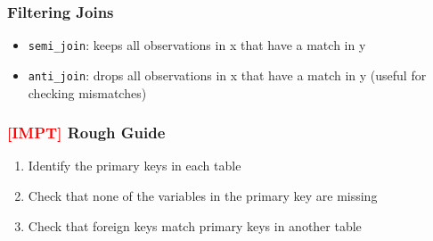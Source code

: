 \documentclass{article}
\newcommand{\impt}[0]{\textcolor{red}{\textbf{[IMPT] }}}
\begin{document}
\begin{multicols}{2}
\subsubsection{Filtering Joins}
\begin{itemize}
	\item \texttt{semi\_join}: keeps all observations in x that have a match in y
	\item \texttt{anti\_join}: drops all observations in x that have a match in y (useful for checking mismatches)
\end{itemize}
\subsubsection{\impt Rough Guide}
\begin{enumerate}
	\item Identify the primary keys in each table
	\item Check that none of the variables in the primary key are missing
	\item Check that foreign keys match primary keys in another table
\end{enumerate}

\end{multicols}
\end{document}
